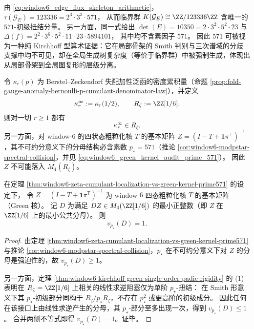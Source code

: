 \begin{remark}\label{rem:window6-kirchhoff-prime-571}
由 \eqref{eq:window6_edge_flux_skeleton_arithmetic}，
\(
\tau(\mathcal{G}_E)=123336=2^3\cdot 3^3\cdot 571
\)，
从而临界群 \(K(\mathcal{G}_E)\cong \ZZ/123336\ZZ\) 含唯一的 \(571\)-初级扭结分量。
另一方面，同一式给出
\(
\det(E)=10350=2\cdot 3^2\cdot 5^2\cdot 23
\)
与
\(
\Delta(f)=2^2\cdot 3^6\cdot 5^2\cdot 11\cdot 23\cdot 5894101
\)，
其中均不含素因子 \(571\)。
因此 \(571\) 可被视为一种纯 Kirchhoff 型算术证据：它在局部骨架的 Smith 判别与三次谱域的分歧支撑中均不可见，却在全局生成树复杂度（等价于临界群）中被强制生成，体现出从局部骨架到全局图复形的层级分离。
\end{remark}

\begin{theorem}[\texorpdfstring{$\{2,3\}$}{2,3}-局部化的累积量环与 Green 核分母素数 \texorpdfstring{$p_\star=571$}{p*=571} 的不可约分叉]\label{thm:window6-zeta-cumulant-localization-vs-green-kernel-prime571}
令 \(\kappa_r(p)\) 为 Berstel--Zeckendorf 失配加性泛函的密度累积量（命题 \ref{prop:fold-gauge-anomaly-bernoulli-p-cumulant-denominator-law}），并定义
\[
\kappa_r^\infty:=\kappa_r(1/2),
\qquad
R_\zeta:=\ZZ[1/6].
\]
则对一切 \(r\ge 1\) 都有
\[
\kappa_r^\infty\in R_\zeta.
\]
另一方面，对 window-\(6\) 的四状态粗粒化核 \(T\) 的基本矩阵
\(
Z=(I-T+\mathbf 1\pi^\top)^{-1}
\)，其不可约分意义下的分母结构必含素数 \(p_\star=571\)（推论 \ref{cor:window6-modpstar-spectral-collision}，并见 \eqref{eq:window6_green_kernel_audit_prime_571}）。
因此 \(Z\) 不可能落入 \(M_4(R_\zeta)\)。
\end{theorem}

\begin{corollary}\label{cor:window6-green-kernel-pstar-valuation-one}
在定理 \ref{thm:window6-zeta-cumulant-localization-vs-green-kernel-prime571} 的设定下，
令 \(Z=(I-T+\mathbf 1\pi^{\mathsf T})^{-1}\) 为 window-\(6\) 四态粗粒化核 \(T\) 的基本矩阵（Green 核）。
记 \(D\) 为满足 \(DZ\in M_4(\ZZ[1/6])\) 的最小正整数（即 \(Z\) 在 \(\ZZ[1/6]\) 上的最小公共分母）。
则
\[
v_{p_\star}(D)=1.
\]
\end{corollary}

\begin{proof}
由定理 \ref{thm:window6-zeta-cumulant-localization-vs-green-kernel-prime571} 与推论 \ref{cor:window6-modpstar-spectral-collision}，\(p_\star\) 在不可约分意义下对 \(Z\) 的分母是强迫性的，故 \(v_{p_\star}(D)\ge 1\)。
\par
另一方面，定理 \ref{thm:window6-kirchhoff-green-single-order-padic-rigidity} 的 (1) 表明在 \(R_\zeta=\ZZ[1/6]\) 上相关的线性求逆阻塞仅为单阶 \(p_\star\)-扭结：
在 Smith 形意义下其 \(p_\star\)-初级部分同构于 \(R_\zeta/p_\star R_\zeta\)，不存在 \(p_\star^2\) 或更高阶的初级成分。
因此任何在该接口上由线性求逆产生的分母，其 \(p_\star\)-部分至多出现一次，得到 \(v_{p_\star}(D)\le 1\)。
合并两侧不等式即得 \(v_{p_\star}(D)=1\)。证毕。
\end{proof}

